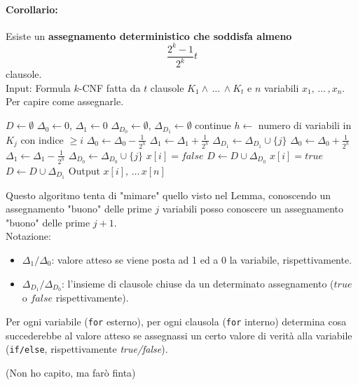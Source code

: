 \paragraph{Corollario:} Esiste un \textbf{assegnamento deterministico che soddisfa almeno} 
$$ \frac{2^k - 1}{2^k} t$$
clausole.\\
Input: Formula $k$-CNF fatta da $t$ clausole $K_1 \wedge \, \dots \, \wedge K_t$ e $n$ variabili $x_1, \, \dots \, , x_n$.\\
Per capire come assegnarle.\\
\begin{algorithmic}
	\STATE $D \leftarrow \emptyset$
		\STATE $\Delta_0 \leftarrow 0$, $\Delta_1 \leftarrow 0$
		\STATE $\Delta_{D_0} \leftarrow \emptyset$, $\Delta_{D_1} \leftarrow \emptyset$
				\STATE continue
			\ENDIF
			\STATE $h \leftarrow$ numero di variabili in $K_j$ con indice $\geq i$
				\STATE $\Delta_0 \leftarrow \Delta_0 - \frac{1}{2^h}$
				\STATE $\Delta_1 \leftarrow \Delta_1 + \frac{1}{2^h}$
				\STATE $\Delta_{D_1} \leftarrow \Delta_{D_1} \cup \{j\}$
			\ELSE
				\STATE $\Delta_0 \leftarrow \Delta_0 + \frac{1}{2^h}$
				\STATE $\Delta_1 \leftarrow \Delta_1 - \frac{1}{2^h}$
				\STATE $\Delta_{D_0} \leftarrow \Delta_{D_0} \cup \{j\}$
			\ENDIF
		\ENDFOR
			\STATE $x[i] = false$
			\STATE $D \leftarrow D \cup \Delta_{D_0}$
		\ELSE
			\STATE $x[i] = true$
			\STATE $D \leftarrow D \cup \Delta_{D_1}$
		\ENDIF
	\ENDFOR
	\STATE Output $x[i], \, \dots \, x[n]$
\end{algorithmic}

\newpage

Questo algoritmo tenta di "mimare" quello visto nel Lemma, conoscendo un assegnamento "buono" delle prime $j$ variabili posso conoscere un assegnamento "buono" delle prime $j+1$.\\

Notazione:
\begin{itemize}
	\item $\Delta_1/\Delta_0$: valore atteso se viene posta ad 1 ed a 0 la variabile, rispettivamente.\\
	
	\item $\Delta_{D_1}/\Delta_{D_0}$: l'insieme di clausole chiuse da un determinato assegnamento ($true$ o $false$ rispettivamente).\\
\end{itemize}

Per ogni variabile (\texttt{for} esterno), per ogni clausola (\texttt{for} interno) determina cosa succederebbe al valore atteso se assegnassi un certo valore di verità alla variabile (\texttt{if/else}, rispettivamente \textit{true/false}).\\

\vfill

(Non ho capito, ma farò finta)

\newpage


